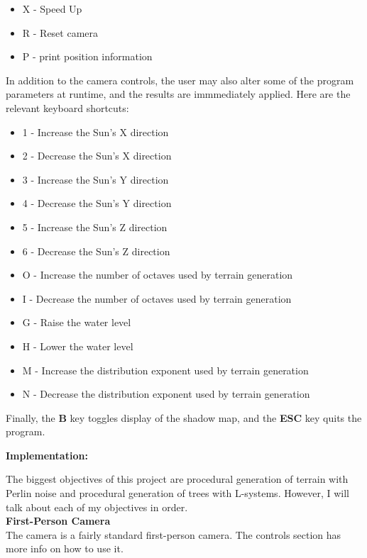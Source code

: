 \documentclass{article}
\begin{document}
\begin{description}
\begin{itemize}
			\item X - Speed Up
			\item R - Reset camera
			\item P - print position information
		\end{itemize}
		In addition to the camera controls, the user may also alter some of the program parameters at runtime, and the results are immmediately applied. Here are the relevant keyboard shortcuts:
		\begin{itemize}
			\item 1 - Increase the Sun's X direction
			\item 2 - Decrease the Sun's X direction
			\item 3 - Increase the Sun's Y direction
			\item 4 - Decrease the Sun's Y direction
			\item 5 - Increase the Sun's Z direction
			\item 6 - Decrease the Sun's Z direction
			\item O - Increase the number of octaves used by terrain generation
			\item I - Decrease the number of octaves used by terrain generation
			\item G - Raise the water level
			\item H - Lower the water level
			\item M - Increase the distribution exponent used by terrain generation
			\item N - Decrease the distribution exponent used by terrain generation
		\end{itemize}
		Finally, the \textbf{B} key toggles display of the shadow map, and the \textbf{ESC} key quits the program.
	\end{description}

\newpage

\Large\noindent\textbf{Implementation:}\\
\normalsize

	The biggest objectives of this project are procedural generation of terrain with Perlin noise and procedural generation of trees with L-systems. However, I will talk about each of my objectives in order.
	\\

	\large\noindent\textbf{First-Person Camera}
	\normalsize
	\\

	The camera is a fairly standard first-person camera. The controls section has more info on how to use it.
	\\
\end{document}
